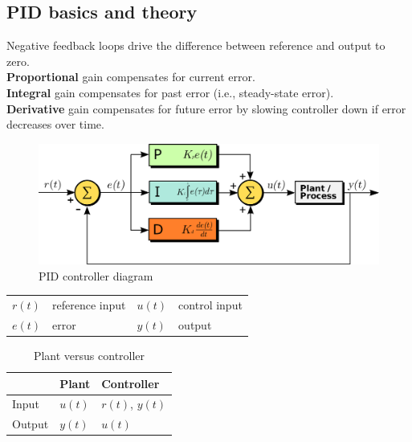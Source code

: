 \documentclass[10pt,conference,compsoc]{IEEEtran}
\begin{document}
\subsection{PID basics and theory}

Negative feedback loops drive the difference between \gls{reference} and
\gls{output} to zero. \\

\textbf{Proportional} gain compensates for current \gls{error}. \\
\textbf{Integral} gain compensates for past error (i.e.,
\gls{steady-state error}). \\
\textbf{Derivative} gain compensates for future error by slowing controller down
  if error decreases over time.

\begin{figure}[H]
  \includegraphics[width=\linewidth]{figs/PID_diagram.png}
  \caption{PID controller diagram \cite{bib:PID_diagram}}
  \label{fig:pid_ctrl_diag}
\end{figure}

\begin{table}[ht]
  \renewcommand{\arraystretch}{1.3}
  \centering
  \begin{tabulary}{\linewidth}{LLLL}
    $r(t)$ & \gls{reference} input & $u(t)$ & control input \\
    $e(t)$ & error & $y(t)$ & \gls{output} \\
  \end{tabulary}
  \label{tab:pid_def}
\end{table}

\begin{table}[ht]
  \caption{Plant versus controller}
  \renewcommand{\arraystretch}{1.3}
  \centering
  \begin{tabular}{|l|ll|}
    \hline
    & \textbf{Plant} & \textbf{Controller} \\
    \hline
    Input & $u(t)$ & $r(t)$, $y(t)$ \\
    Output & $y(t)$ & $u(t)$ \\
    \hline
  \end{tabular}
  \label{tab:plant_v_controller}
\end{table}
\end{document}
